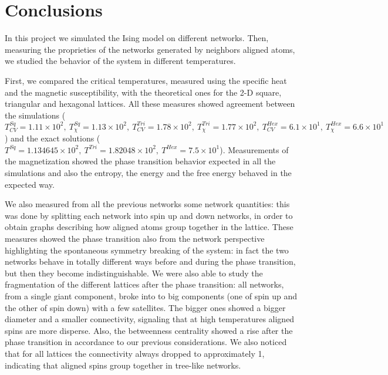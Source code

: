 \section{Conclusions}
In this project we simulated the Ising model on different networks. Then, measuring the proprieties of the networks generated by neighbors aligned atoms, we studied the behavior of the system in different temperatures.

First, we compared the critical temperatures, measured using the specific heat and the magnetic susceptibility, with the theoretical ones for the 2-D square, triangular and hexagonal lattices. All these measures showed agreement between the simulations ($T_{CV}^{Sq}=1.11\times10^2,\ T_{\chi}^{Sq}=1.13\times10^2,\ T_{CV}^{Tri}=1.78\times10^2,\ T_{\chi}^{Tri}=1.77\times10^2,\ T_{CV}^{Hex}=6.1\times10^1,\ T_{\chi}^{Hex}=6.6\times10^1$) and the exact solutions ($T^{Sq}= 1.134645\times 10^2,\ T^{Tri}= 1.82048\times 10^2,\ T^{Hex}=7.5\times 10^1$). Measurements of the magnetization showed the phase transition behavior expected in all the simulations and also the entropy, the energy and the free energy behaved in the expected way.

We also measured from all the previous networks some network quantities: this was done by splitting each network into spin up and down networks, in order to obtain graphs describing how aligned atoms group together in the lattice. These measures showed the phase transition also from the network perspective highlighting the spontaneous symmetry breaking of the system: in fact the two networks behave in totally different ways before and during the phase transition, but then they become indistinguishable. We were also able to study the fragmentation of the different lattices after the phase transition: all networks, from a single giant component, broke into to big components (one of spin up and the other of spin down) with a few satellites. The bigger ones showed a bigger diameter and a smaller connectivity, signaling that at high temperatures aligned spins are more disperse. Also, the betweenness centrality showed a rise after the phase transition in accordance to our previous considerations. We also noticed that for all lattices the connectivity always dropped to approximately 1, indicating that aligned spins group together in tree-like networks.

